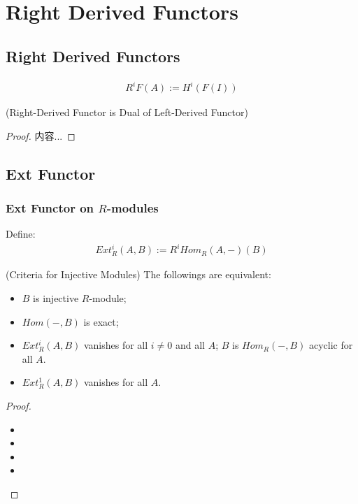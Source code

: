 \documentclass[Total.tex]{subfiles}
\begin{document}
		\section{Right Derived Functors}
			\subsection{Right Derived Functors}
				\begin{Def}
					\begin{gather*}
						R^iF(A):=H^i(F(I))
					\end{gather*}
				\end{Def}
				\begin{proposition}
					(Right-Derived Functor is Dual of Left-Derived Functor)
				\end{proposition}
				\begin{proof}
					内容...
				\end{proof}
			\subsection{Ext Functor}
			\subsubsection{Ext Functor on $R$-modules}
				\begin{Def}
					Define:
					\begin{gather*}
						Ext^i_R(A,B):=R^iHom_R(A,-)(B)
					\end{gather*}
				\end{Def}
				
				\begin{proposition}
					(Criteria for Injective Modules) The followings are equivalent:
					\begin{itemize}
						\item $B$ is injective $R$-module;
						\item $Hom(-,B)$ is exact;
						\item $Ext_R^i(A,B)$ vanishes for all $i\not=0$ and all $A$; $B$ is $Hom_R(-,B)$ acyclic for all $A$.
						\item $Ext^1_R(A,B)$ vanishes for all $A$.
					\end{itemize}
				\end{proposition}
				\begin{proof}
					\begin{itemize}
						\item 
						\item 
						\item 
						\item 
					\end{itemize}
				\end{proof}
				
\end{document}
